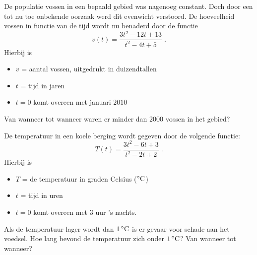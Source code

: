 \documentclass[a4paper,12pt]{article}
\begin{document}
\begin{oefening}
De populatie vossen in een bepaald gebied was nagenoeg constant. Doch door een tot nu toe onbekende oorzaak werd dit evenwicht verstoord. De hoeveelheid vossen in functie van de tijd wordt nu benaderd door de functie
$$v(t)=\dfrac{3t^2-12t+13}{t^2-4t+5}\;.$$
Hierbij is
\begin{itemize}
  \item $v$ = aantal vossen, uitgedrukt in duizendtallen
  \item $t$ = tijd in jaren
  \item $t = 0$ komt overeen met januari $2010$
\end{itemize}
Van wanneer tot wanneer waren er minder dan $2000$ vossen in het gebied?
\end{oefening}

\begin{oefening}
De temperatuur in een koele berging wordt gegeven door de volgende functie:
$$T(t)=\dfrac{3t^2-6t+3}{t^2-2t+2}\;.$$
Hierbij is
\begin{itemize}
  \item $T$ = de temperatuur in graden Celsius ($\grC$)
  \item $t$ = tijd in uren
  \item $t = 0$ komt overeen met 3 uur 's nachts.
\end{itemize}
Als de temperatuur lager wordt dan $1 \grC$ is er gevaar voor schade aan het voedsel. Hoe lang bevond de temperatuur zich onder $1 \grC$? Van wanneer tot wanneer?
\end{oefening}
\end{document}
